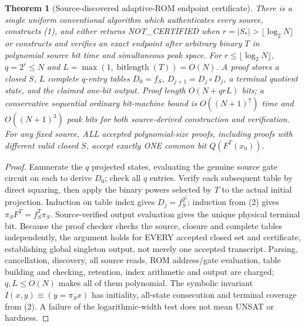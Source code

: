 \documentclass[11pt]{article}
\newtheorem{theorem}{Theorem}
\begin{document}
\begin{theorem}[Source-discovered adaptive-ROM endpoint certificate]
There is a single uniform conventional algorithm which authenticates every source, constructs (1), and either returns NOT\_CERTIFIED when $r=|S_*|>\lfloor\log_2N\rfloor$ or constructs and verifies an exact endpoint after arbitrary binary $T$ in polynomial source bit time and simultaneous peak space. For $r\le\lfloor\log_2N\rfloor$, $q=2^r\le N$ and $L=\max(1,\operatorname{bitlength}(T))=O(N)$. A proof stores a closed $S$, $L$ complete $q$-entry tables $D_0=f_S$, $D_{j+1}=D_j\circ D_j$, a terminal quotient state, and the claimed one-bit output. Proof length $O(N+qrL)$ bits; a conservative sequential ordinary bit-machine bound is $O((N+1)^7)$ time and $O((N+1)^3)$ peak bits for both source-derived construction and verification. For any fixed source, ALL accepted polynomial-size proofs, including proofs with different valid closed $S$, accept exactly ONE common bit $Q(F^T(x_0))$.
\end{theorem}
\begin{proof}
Enumerate the $q$ projected states, evaluating the genuine source gate circuit on each to derive $D_0$; check all $q$ entries. Verify each subsequent table by direct squaring, then apply the binary powers selected by $T$ to the actual initial projection. Induction on table index gives $D_j=f_S^{2^j}$; induction from (2) gives $\pi_SF^T=f_S^T\pi_S$. Source-verified output evaluation gives the unique physical terminal bit. Because the proof checker checks the source, closure and complete tables independently, the argument holds for EVERY accepted closed set and certificate, establishing global singleton output, not merely one accepted transcript. Parsing, cancellation, discovery, all source reads, ROM address/gate evaluation, table building and checking, retention, index arithmetic and output are charged; $q,L\le O(N)$ makes all of them polynomial. The symbolic invariant $I(x,y)\equiv(y=\pi_Sx)$ has initiality, all-state consecution and terminal coverage from (2). A failure of the logarithmic-width test does not mean UNSAT or hardness.
\end{proof}
\end{document}
